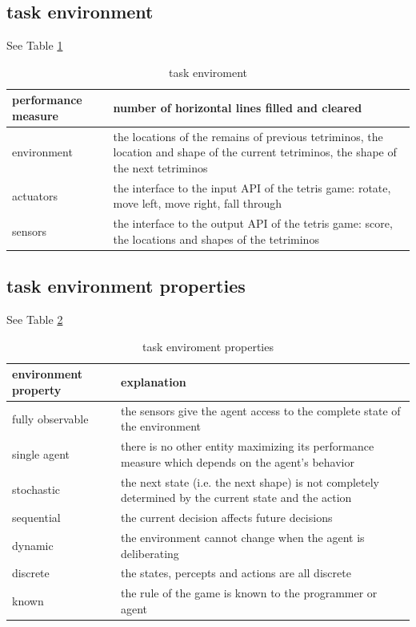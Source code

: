 \documentclass[12pt]{article}
\begin{document}
\subsection{task environment}
See Table \ref{tab:environment}
\begin{table}[htb]
  \centering
  \begin{tabularx}{\textwidth}{|l|X|} \hline
    performance measure & number of horizontal lines filled and cleared \\ \hline
    environment & the locations of the remains of previous tetriminos, the location and shape of the current tetriminos, the shape of the next tetriminos \\ \hline
    actuators & the interface to the input API of the tetris game: rotate, move left, move right, fall through \\ \hline
    sensors & the interface to the output API of the tetris game: score, the locations and shapes of the tetriminos \\ \hline
  \end{tabularx}
  \caption{task enviroment}
  \label{tab:environment}
\end{table}
\subsection{task environment properties}
See Table \ref{tab:properties}
\begin{table}[htb]
  \centering
  \begin{tabularx}{\textwidth}{|l|X|} \hline
    environment property & explanation \\ \hline
    fully observable & the sensors give the agent access to the complete state of the environment \\ \hline
    single agent & there is no other entity maximizing its performance measure which depends on the agent's behavior \\ \hline
    stochastic & the next state (i.e. the next shape) is not completely determined by the current state and the action \\ \hline
    sequential & the current decision affects future decisions \\ \hline
    dynamic & the environment cannot change when the agent is deliberating \\ \hline
    discrete & the states, percepts and actions are all discrete \\ \hline
    known & the rule of the game is known to the programmer or agent \\ \hline
  \end{tabularx}
  \caption{task enviroment properties}
  \label{tab:properties}
\end{table}
\end{document}
